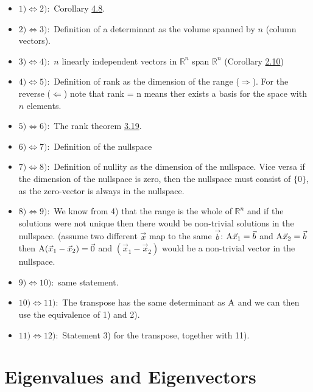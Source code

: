 \documentclass[
  a4paper,
  DIV=11,
  numbers=noendperiod,
  oneside]{scrreprt}
\providecommand{\tightlist}{%
  \setlength{\itemsep}{0pt}\setlength{\parskip}{0pt}}
\theoremstyle{definition}
\theoremstyle{remark}
\newenvironment{fbx}[3]{\begin{tcolorbox}[enhanced, breakable,%
attach boxed title to top*={xshift=1.4pt},
boxed title style={boxrule=0.0mm, fuzzy shadow={1pt}{-1pt}{0mm}{0.1mm}{gray}, arc=.3em, rounded corners=east, sharp corners=west}, colframe=#1-color2, colbacktitle=#1-color1, colback = white, coltitle=black,  titlerule=0mm, toprule=0pt, bottomrule=.7pt, leftrule=.3em, rightrule=0pt, outer arc=.3em,  arc=0pt,	 sharp corners = east, left=.5em, bottomtitle=1mm, toptitle=1mm,title=\textbf{#2}\hspace{0.5em}{#3}]}
{\end{tcolorbox}}
\begin{document}
\label{Proofux2a-4.11}
\begin{fbx}{Proof}{Proof}{}
\label{Proof*-4.11}

\begin{itemize}
\tightlist
\item
  \(1) \Leftrightarrow 2):\) Corollary \hyperref[invdet]{4.8}.
\item
  \(2) \Leftrightarrow 3):\) Definition of a determinant as the volume
  spanned by \(n\) (column vectors).
\item
  \(3) \Leftrightarrow 4):\) \(n\) linearly independent vectors in
  \(\mathbb{R}^n\) span \(\mathbb{R}^n\) (Corollary
  \hyperref[nvectorsspanrn]{2.10})
\item
  \(4) \Leftrightarrow 5):\) Definition of rank as the dimension of the
  range (\(\Rightarrow\)). For the reverse (\(\Leftarrow\)) note that
  rank = n means ther exists a basis for the space with \(n\) elements.
\item
  \(5) \Leftrightarrow 6):\) The rank theorem
  \hyperref[ranktheorem]{3.19}.
\item
  \(6) \Leftrightarrow 7):\) Definition of the nullspace
\item
  \(7) \Leftrightarrow 8):\) Definition of nullity as the dimension of
  the nullspace. Vice versa if the dimension of the nullspace is zero,
  then the nullspace must consist of \(\{0 \}\), as the zero-vector is
  always in the nullspace.
\item
  \(8) \Leftrightarrow 9):\) We know from 4) that the range is the whole
  of \(\mathbb{R}^n\) and if the solutions were not unique then there
  would be non-trivial solutions in the nullspace. (assume two different
  \(\vec{x}\) map to the same \(\vec{b}\): \({\rm A}\vec{x}_1= \vec{b}\)
  and \({\rm A}\vec{x}_2= \vec{b}\) then
  \({\rm A}(\vec{x}_1  -\vec{x}_2)= \vec{0}\) and
  \((\vec{x}_1  -\vec{x}_2)\) would be a non-trivial vector in the
  nullspace.
\item
  \(9) \Leftrightarrow 10):\) same statement.
\item
  \(10) \Leftrightarrow 11):\) The transpose has the same determinant as
  \({\rm A}\) and we can then use the equivalence of 1) and 2).
\item
  \(11) \Leftrightarrow 12):\) Statement 3) for the transpose, together
  with 11).
\end{itemize}

\end{fbx}

\chapter{Eigenvalues and
Eigenvectors}\label{eigenvalues-and-eigenvectors}
\end{document}
